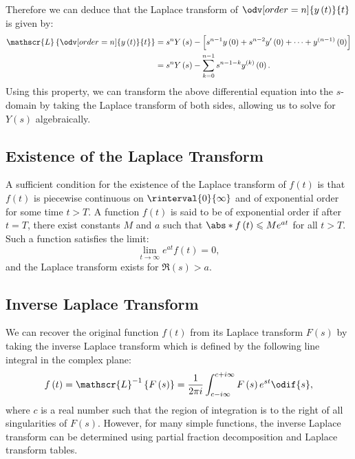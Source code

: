 \documentclass{article}
\begin{document}
Therefore we can deduce that the Laplace transform of
\(\displaystyle \odv[order=n]{y\left( t \right)}{t}\) is given by:
\begin{align*}
    \mathscr{L}\left\{ \odv[order=n]{y\left( t \right)}{t} \right\} & = s^n Y\left( s \right) - \left[ s^{n-1} y\left( 0 \right) + s^{n-2} y'\left( 0 \right) + \cdots + y^{\left( n-1 \right)}\left( 0 \right) \right] \\
                                                                    & = s^n Y\left( s \right) - \sum_{k=0}^{n-1} s^{n-1-k} y^{\left( k \right)}\left( 0 \right).
\end{align*}
Using this property, we can transform the above differential equation
into the \(s\)-domain by taking the Laplace transform of both sides,
allowing us to solve for \(Y\left( s \right)\) algebraically.
\subsection{Existence of the Laplace Transform}
A sufficient condition for the existence of the Laplace transform of
\(f\left( t \right)\) is that \(f\left( t \right)\) is piecewise
continuous on \(\rinterval{0}{\infty}\) and of exponential order for
some time \(t > T\). A function \(f\left( t \right)\) is said to be of
exponential order if after \(t = T\), there exist constants \(M\) and
\(a\) such that \(\abs*{f\left( t \right)} \leqslant M e^{at}\) for all
\(t > T\). Such a function satisfies the limit:
\begin{equation*}
    \lim_{t \to \infty} e^{at} f\left( t \right) = 0,
\end{equation*}
and the Laplace transform exists for \(\Re\left( s \right) > a\).
\subsection{Inverse Laplace Transform}
We can recover the original function \(f\left( t \right)\) from its
Laplace transform \(F\left( s \right)\) by taking the inverse Laplace
transform which is defined by the following line integral in the
complex plane:
\begin{equation*}
    f\left( t \right) = \mathscr{L}^{-1}\left\{ F\left( s \right) \right\} = \frac{1}{2\pi i} \int_{c - i \infty}^{c + i \infty} F\left( s \right) e^{st} \odif{s},
\end{equation*}
where \(c\) is a real number such that the region of integration is to
the right of all singularities of \(F\left( s \right)\). However, for
many simple functions, the inverse Laplace transform can be determined
using partial fraction decomposition and Laplace transform tables.
\end{document}
